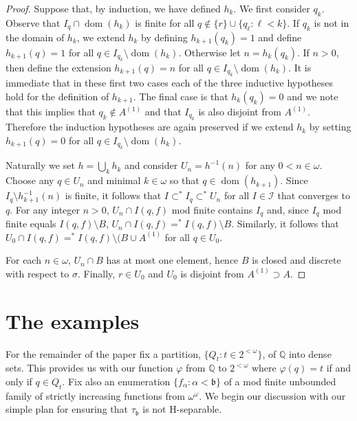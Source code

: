 \documentclass{amsart}
\theoremstyle{definition}
\theoremstyle{remark}
\begin{document}
\begin{proof}
     Suppose that, by induction, we  have defined
      $h_k$.  We first consider $q_k$. 
    Observe that $I_q\cap \operatorname{dom}(h_k)$ is finite
    for all $q\notin \{r\}\cup \{ q_\ell : \ell < k\}$. 
      If $q_k$ is
      not in the domain of $h_k$, we extend $h_k$ by
      defining $h_{k+1}(q_k) = 1$
      and define $h_{k+1}(q) = 1$ for all $q\in I_{q_k}\setminus
       \operatorname{dom}(h_k)$.
       Otherwise let $n=h_k(q_k)$. If $n>0$,
        then define the extension
        $h_{k+1}(q) = n$ for all $q\in I_{q_k}\setminus
        \operatorname{dom}(h_k)$. It is immediate
        that in these first two cases each of the three inductive
        hypotheses hold for the definition of $h_{k+1}$.
The final case is that $h_k(q_k) = 0$ and we note that
this implies that $q_k\notin A^{(1)}$ and that 
 $I_{q_k}$ is also disjoint from $A^{(1)}$. Therefore the induction
 hypotheses are again preserved if we extend $h_k$ 
 by setting $h_{k+1}(q) = 0$
 for all $q\in I_{q_k}\setminus \operatorname{dom}(h_k)$.


\egroup
     
    Naturally we set $h=\bigcup_k h_k$ and consider
     $U_n = h^{-1}(n)$ for any $0<n\in\omega$. Choose
     any $q\in U_n$ and minimal $k\in\omega$ so that
      $q\in \operatorname{dom}(h_{k+1})$.    
Since $I_q\setminus h_{k+1}^{-1}(n)$ is finite,
 it follows that $I\subset^* I_q \subset^* U_n$ for
 all $I\in\mathcal I$ that converges to $q$. For
 any integer $n>0$, $U_n \cap I(q,f) $ mod finite
 contains $I_q$ and, since $I_q$ mod finite equals
  $I(q,f)\setminus B$, $U_n\cap I(q,f)=^* I(q,f)\setminus B$.
  Similarly, it follows that   $U_0\cap I(q,f) =^* I(q,f)
  \setminus (B\cup A^{(1)}$ for all $q\in U_0$. 

For each $n\in\omega$, $U_n\cap B$ has at most one element,
 hence $B$ is closed and discrete with respect to $\sigma$.
 Finally, $r\in U_0$ and $U_0$ is disjoint from $A^{(1)}\supset A$.
   \end{proof}

\section{The examples}

For the remainder of the paper fix a partition,
 $\{ Q_t : t\in 2^{<\omega}\}$, of $\mathbb Q$ into dense
 sets. This provides us with our function $\varphi$ from
  $\mathbb Q$ to $2^{<\omega}$ where $\varphi(q) = t$
  if and only if $q\in Q_t$.  Fix also an enumeration
   $\{ f_\alpha : \alpha < \mathfrak b\}$
    of a  mod finite unbounded family of strictly
    increasing functions from $\omega^\omega$. 
We begin our discussion with our simple plan for
ensuring that $\tau_{\mathfrak b}$ is not H-separable.
\end{document}
